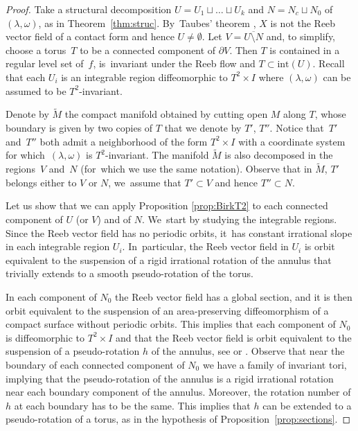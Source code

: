 \documentclass[10pt]{amsart}
\theoremstyle{definition}
\begin{document}
\begin{proof}
Take a structural decomposition $U=U_1\sqcup \ldots \sqcup U_k$ and $N= N_c \sqcup N_0$ of $(\lambda,\omega)$, as in Theorem~\ref{thm:struc}. By~Taubes' theorem \cite{Taub}, $X$ is not the Reeb vector field of a contact form and hence $U\neq \emptyset$. Let $V=\overline{U\setminus N}$ and, to simplify, choose a torus~$T$ to be a connected component of $\partial V$. Then $T$ is contained in a regular level set of~$f$, is~invariant under the Reeb flow and $T\subset \text{int}(U)$. Recall that each $U_i$ is an integrable region diffeomorphic to $T^2\times I$ where $(\lambda,\omega)$ can be assumed to be $T^2$-invariant.

Denote by $\widetilde{M}$ the compact manifold obtained by cutting open $M$ along $T$, whose boundary is given by two copies of $T$ that we denote by $T'$, $T''$. Notice that~$T'$ and~$T''$ both admit a neighborhood of the form $T^2\times I$ with a coordinate system for which~$(\lambda,\omega)$ is $T^2$-invariant. The manifold $\widetilde M$ is also decomposed in the regions~$V$ and~$N$ (for~which we use the same notation). Observe that in $\widetilde M$, $T'$ belongs either to $V$ or $N$, we~assume that $T'\subset V$ and hence $T''\subset N$.

Let us show that we can apply Proposition \ref{prop:BirkT2} to each connected component of $U$ (or $V$) and of $N$. We~start by studying the integrable regions. Since the Reeb vector field has no periodic orbits, it~has constant irrational slope in each integrable region $U_i$. In~particular, the Reeb vector field in $U_i$ is orbit equivalent to the suspension of a rigid irrational rotation of the annulus that trivially extends to a smooth pseudo-rotation of the torus.

In each component of $N_0$ the Reeb vector field has a global section, and it is then orbit equivalent to the suspension of an area-preserving diffeomorphism of a compact surface without periodic orbits. This implies that each component of $N_0$ is diffeomorphic to $T^2\times I$ and that the Reeb vector field is orbit equivalent to the suspension of a pseudo-rotation $h$ of the annulus, see \cite[p.\,20]{Re} or \cite[\S 5.3]{HT}. Observe that near the boundary of each connected component of $N_0$ we have a family of invariant tori, implying that the pseudo-rotation of the annulus is a rigid irrational rotation near each boundary component of the annulus. Moreover, the rotation number of $h$ at each boundary has to be the same. This implies that $h$ can be extended to a pseudo-rotation of a torus, as in the hypothesis of Proposition~\ref{prop:sections}.


\end{proof}
\end{document}
